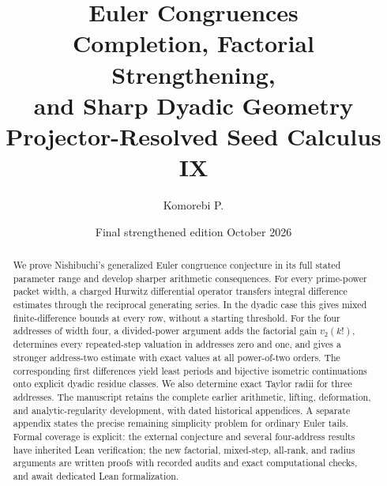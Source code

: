 \documentclass[11pt]{article}
\title{\textbf{Euler Congruences}\\[5pt]
  \Large Completion, Factorial Strengthening,\\ and Sharp Dyadic Geometry\\[7pt]
  \large Projector-Resolved Seed Calculus IX}
\author{Komorebi P.}
\date{Final strengthened edition\quad 6 October 2026}
\theoremstyle{definition}
\theoremstyle{remark}
\numberwithin{equation}{section}
\begin{document}
\KomorebiCover

\relax
\begin{abstract}
We prove Nishibuchi's generalized Euler congruence conjecture in its full stated parameter range and develop sharper arithmetic consequences. For every prime-power packet width, a charged Hurwitz differential operator transfers integral difference estimates through the reciprocal generating series. In the dyadic case this gives mixed finite-difference bounds at every row, without a starting threshold. For the four addresses of width four, a divided-power argument adds the factorial gain $v_2(k!)$, determines every repeated-step valuation in addresses zero and one, and gives a stronger address-two estimate with exact values at all power-of-two orders. The corresponding first differences yield least periods and bijective isometric continuations onto explicit dyadic residue classes. We also determine exact Taylor radii for three addresses. The manuscript retains the complete earlier arithmetic, lifting, deformation, and analytic-regularity development, with dated historical appendices. A separate appendix states the precise remaining simplicity problem for ordinary Euler tails. Formal coverage is explicit: the external conjecture and several four-address results have inherited Lean verification; the new factorial, mixed-step, all-rank, and radius arguments are written proofs with recorded audits and exact computational checks, and await dedicated Lean formalization.
\end{abstract}




\clearpage
{\small\setlength{\parskip}{0pt}\tableofcontents}
\clearpage


\clearpage

\clearpage




\end{document}

